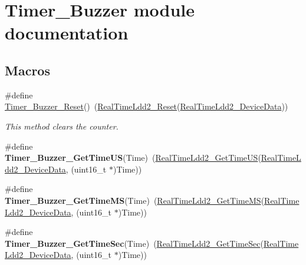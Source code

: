 \hypertarget{group___timer___buzzer__module}{\section{Timer\-\_\-\-Buzzer module documentation}
\label{group___timer___buzzer__module}
}
\subsection*{Macros}
\begin{DoxyCompactItemize}
\item 
\#define \hyperlink{group___timer___buzzer__module_gabf9b072a123041c1a77f3bd869d33c18}{Timer\-\_\-\-Buzzer\-\_\-\-Reset}()~(\hyperlink{group___real_time_ldd2__module_gae3be94a12612ec0614698cc7a3c5855a}{Real\-Time\-Ldd2\-\_\-\-Reset}(\hyperlink{group___real_time_ldd2__module_ga368e4a6b140bc3df3e6e9fd64fc994ce}{Real\-Time\-Ldd2\-\_\-\-Device\-Data}))
\begin{DoxyCompactList}\small\item\em This method clears the counter. \end{DoxyCompactList}\item 
\hypertarget{group___timer___buzzer__module_ga176de9e8983fb1b36ae110b8542c437b}{\#define {\bfseries Timer\-\_\-\-Buzzer\-\_\-\-Get\-Time\-U\-S}(Time)~(\hyperlink{group___real_time_ldd2__module_ga256d6a82db79299e421b0bac967ab2fb}{Real\-Time\-Ldd2\-\_\-\-Get\-Time\-U\-S}(\hyperlink{group___real_time_ldd2__module_ga368e4a6b140bc3df3e6e9fd64fc994ce}{Real\-Time\-Ldd2\-\_\-\-Device\-Data}, (uint16\-\_\-t $\ast$)Time))}\label{group___timer___buzzer__module_ga176de9e8983fb1b36ae110b8542c437b}

\item 
\hypertarget{group___timer___buzzer__module_ga1b81f5bcd72b02b9fd627ef5ca2a3b6e}{\#define {\bfseries Timer\-\_\-\-Buzzer\-\_\-\-Get\-Time\-M\-S}(Time)~(\hyperlink{group___real_time_ldd2__module_ga0ef362beecb2f27b82b32b4b8a28bfcd}{Real\-Time\-Ldd2\-\_\-\-Get\-Time\-M\-S}(\hyperlink{group___real_time_ldd2__module_ga368e4a6b140bc3df3e6e9fd64fc994ce}{Real\-Time\-Ldd2\-\_\-\-Device\-Data}, (uint16\-\_\-t $\ast$)Time))}\label{group___timer___buzzer__module_ga1b81f5bcd72b02b9fd627ef5ca2a3b6e}

\item 
\hypertarget{group___timer___buzzer__module_gac4dab670248d23c2021c22a9c26557ae}{\#define {\bfseries Timer\-\_\-\-Buzzer\-\_\-\-Get\-Time\-Sec}(Time)~(\hyperlink{group___real_time_ldd2__module_ga4bb188fa300586aacb0fe28460d8b6a6}{Real\-Time\-Ldd2\-\_\-\-Get\-Time\-Sec}(\hyperlink{group___real_time_ldd2__module_ga368e4a6b140bc3df3e6e9fd64fc994ce}{Real\-Time\-Ldd2\-\_\-\-Device\-Data}, (uint16\-\_\-t $\ast$)Time))}\label{group___timer___buzzer__module_gac4dab670248d23c2021c22a9c26557ae}

\end{DoxyCompactItemize}


